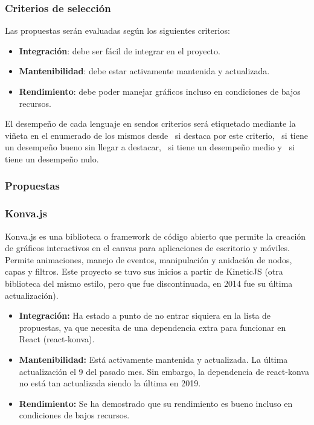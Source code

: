 \subsubsection{Criterios de selección}

Las propuestas serán evaluadas según los siguientes criterios:

\begin{itemize}
    \item \textbf{Integración}: debe ser fácil de integrar en el proyecto.
    \item \textbf{Mantenibilidad}: debe estar activamente mantenida y actualizada.
    \item \textbf{Rendimiento}: debe poder manejar gráficos incluso en condiciones de bajos recursos.
\end{itemize}

El desempeño de cada lenguaje en sendos criterios será etiquetado mediante la viñeta en el enumerado de los mismos desde \esp~si destaca por este criterio, \bien~si tiene un desempeño bueno sin llegar a destacar, \regular~si tiene un desempeño medio y \mal~si tiene un desempeño nulo.

\subsubsection{Propuestas}

\subsubsection{Konva.js}

Konva.js es una biblioteca o framework de código abierto que permite la creación de gráficos interactivos en el canvas para aplicaciones de escritorio y móviles. Permite animaciones, manejo de eventos, manipulación y anidación de nodos, capas y filtros. Este proyecto se tuvo sus inicios a partir de KineticJS (otra biblioteca del mismo estilo, pero que fue discontinuada, en 2014 fue su última actualización).

\begin{itemize}
    \item[\regular] \textbf{Integración:} Ha estado a punto de no entrar siquiera en la lista de propuestas, ya que necesita de una dependencia extra para funcionar en React (react-konva).
    \item[\bien] \textbf{Mantenibilidad:} Está activamente mantenida y actualizada. La última actualización el 9 del pasado mes. Sin embargo, la dependencia de react-konva no está tan actualizada siendo la última en 2019.
    \item[\bien] \textbf{Rendimiento:} Se ha demostrado que su rendimiento es bueno incluso en condiciones de bajos recursos.
\end{itemize}

